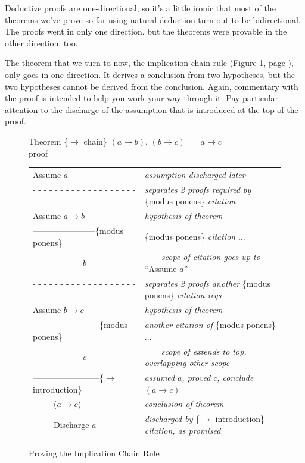 {Deductive proofs are one-directional,
so it's a little ironic that most
of the theorems we've prove so far using natural deduction
turn out to be bidirectional.
The proofs went in only one direction,
but the theorems were provable in the other direction, too.

The theorem that we turn to now, the implication chain rule
(Figure \ref{fig:impchain-proof}, page \pageref{fig:impchain-proof}),
only goes in one direction.
It derives a conclusion from two hypotheses,
but the two hypotheses cannot be derived from the conclusion.
Again, commentary with the proof is intended
to help you work your way through it.
Pay particular attention to the discharge of the
assumption that is introduced at the top of the proof.

\begin{figure}
Theorem \{$\rightarrow$ chain\}
$(a \rightarrow b)$, $(b \rightarrow c)$ $\vdash$ $a \rightarrow c$ \\
proof
\begin{center}
\begin{tabular}{ll}
Assume $a$                                             &\emph{assumption discharged later}\\
 - - - - - - - - - - - - - - - - - - - - - - - -       &\emph{separates 2 proofs required by} \{modus ponens\} \emph{citation}\\
Assume $a \rightarrow b$                               &\emph{hypothesis of theorem}\\
-----------------------\{modus ponens\}                &\{modus ponens\} \emph{citation} $\dots$\\
~~~~~~~~~~~~$b$                                        &~~~~\emph{scope of citation goes up to} ``Assume $a$''\\
 - - - - - - - - - - - - - - - - - - - - - - - -       &\emph{separates 2 proofs another} \{modus ponens\} \emph{citation reqs}\\
Assume $b \rightarrow c$                               &\emph{hypothesis of theorem}\\
------------------------\{modus ponens\}               &\emph{another citation of} \{modus ponens\} $\dots$\\
~~~~~~~~~~~~$c$                                        &~~~~\emph{scope of extends to top, overlapping other scope}\\
------------------------\{$\rightarrow$ introduction\} &\emph{assumed} $a$\emph{, proved} $c$\emph{, conclude} $(a \rightarrow c)$\\
~~~~~($a \rightarrow c$)                               &\emph{conclusion of theorem} \\
~~~~~Discharge $a$                                     &\emph{discharged by} \{$\rightarrow$ introduction\} \emph{citation}\emph{, as promised}\\
\end{tabular}
\end{center}
\caption{Proving the Implication Chain Rule}
\label{fig:impchain-proof}
\end{figure}

}
